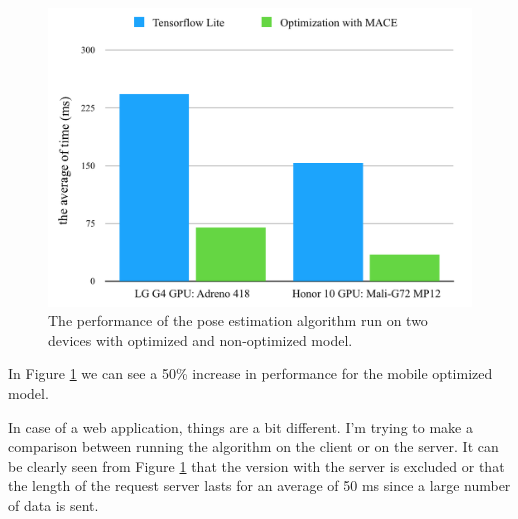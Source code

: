  \begin{figure}[htbp]
	\centerline{\includegraphics[scale=0.7]{fig/mobile-performace.png}}  
	\caption{The performance of the pose estimation algorithm run on two devices with optimized and non-optimized model.}
	\label{fig:mobile-perf}
\end{figure}

In Figure \ref{fig:mobile-perf} we can see a 50\% increase in performance for the mobile optimized model.

In case of a web application, things are a bit different. I'm trying to make a comparison between running the algorithm on the client or on the server. It can be clearly seen from Figure \ref{fig:mobile-perf} that the version with the server is excluded or that the length of the request server lasts for an average of 50 ms since a large number of data is sent.

